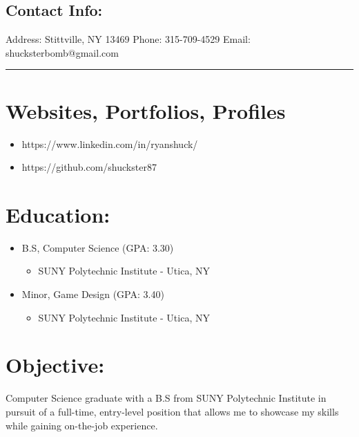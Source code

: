\documentclass[12pt, oneside, a4paper]{article}
\begin{document}
    \begin{flushleft}
    \section*{Contact Info:}
    \footnotesize
    Address: Stittville, NY 13469
    \newline
    Phone: 315-709-4529
    \newline
    Email: shucksterbomb@gmail.com     
    \end{flushleft}

    \noindent
    {\color{blue} \rule{\linewidth}{1mm}}

    \section*{Websites, Portfolios, Profiles}
    \begin{itemize}
    \scriptsize
        \item https://www.linkedin.com/in/ryanshuck/
        \item https://github.com/shuckster87
    \end{itemize}

    \section*{Education:}
    \begin{itemize}
    \scriptsize
    \item B.S, Computer Science  (GPA: 3.30)
        \begin{itemize}
            \item SUNY Polytechnic Institute - Utica, NY
        \end{itemize}
    \item Minor, Game Design (GPA: 3.40)
        \begin{itemize}
            \item SUNY Polytechnic Institute - Utica, NY
        \end{itemize}

    \end{itemize}

    \section*{Objective:}
    \begin{flushleft}
        \footnotesize
        Computer Science graduate with a B.S from SUNY Polytechnic Institute in pursuit of a full-time, entry-level position that allows me to showcase my skills while gaining on-the-job experience. 
    \end{flushleft}
   
\end{document}
